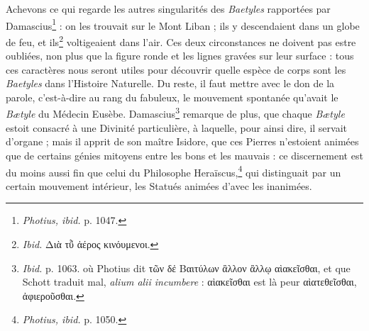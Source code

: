 \documentclass[a4paper, 11pt, oneside, polutonikogreek, french]{article}
\begin{document}
Achevons ce qui regarde les autres singularités des \emph{Baetyles} rapportées par Damascius\footnote{\emph{Photius, ibid.} p. 1047.} : on les trouvait sur le Mont Liban ; ils y descendaient dans un globe de feu, et ils\footnote{\emph{Ibid.} Διὰ τῧ ἀέρος κινόυμενοι.} voltigeaient dans l'air. Ces deux circonstances ne doivent pas estre oubliées, non plus que la figure ronde et les lignes gravées sur leur surface : tous ces caractères nous seront utiles pour découvrir quelle espèce de corps sont les \emph{Baetyles} dans l'Histoire Naturelle. Du reste, il faut mettre avec le don de la parole, c'est-à-dire au rang du fabuleux, le mouvement spontanée qu'avait le \emph{Bætyle} du Médecin Eusèbe. Damascius\footnote{\emph{Ibid.} p. 1063. où Photius dit τῶν δἐ Βαιτύλων ἂλλον ἂλλῳ αὶακεῖσθαι, et que Schott traduit mal, \emph{alium alii incumbere} : αὶακεῖσθαι est là peur αὶατεθεῖσθαι, ἀφιεροῦσθαι.} remarque de plus, que chaque \emph{Bætyle} estoit consacré à une Divinité particulière, à laquelle, pour ainsi dire, il servait d'organe ; mais il apprit de son maître Isidore, que ces Pierres n'estoient animées que de certains génies mitoyens entre les bons et les mauvais : ce discernement est du moins aussi fin que celui du Philosophe Heraïscus,\footnote{\emph{Photius, ibid.} p. 1050.} qui distinguait par un certain mouvement intérieur, les Statués animées d'avec les inanimées.
\end{document}
